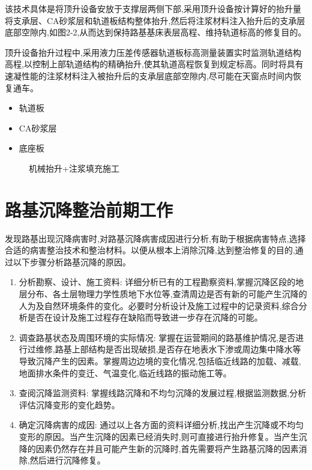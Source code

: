 \documentclass[a4paper,12pt]{ctexrep}
\begin{document}
该技术具体是将顶升设备安放于支撑层两侧下部,采用顶升设备按计算好的抬升量将支承层、CA砂浆层和轨道板结构整体抬升,然后将注浆材料注入抬升后的支承层底部空隙内,如图2-2,从而达到保持路基基床表层高程、维持轨道标高的修复目的。

顶升设备抬升过程中,采用液力压差传感器轨道板标高测量装置实时监测轨道结构高程,以控制上部轨道结构的精确抬升,使其轨道高程恢复到规定标高。同时将具有速凝性能的注浆材料注入被抬升后的支承层底部空隙内,尽可能在天窗点时间内恢复通车。

\begin{itemize}
    \item 轨道板
    \item CA砂浆层
    \item 底座板
\end{itemize}

\begin{figure}[htbp]
    \centering
    \caption{机械抬升+注浆填充施工}
    \label{fig:2-2}
\end{figure}

\section{路基沉降整治前期工作}

发现路基出现沉降病害时,对路基沉降病害成因进行分析,有助于根据病害特点,选择合适的病害整治技术和整治材料。以便从根本上消除沉降,达到整治修复的目的,通过以下步骤分析路基沉降的原因。

\begin{enumerate}
    \item 分析勘察、设计、施工资料: 详细分析已有的工程勘察资料,掌握沉降区段的地层分布、各土层物理力学性质地下水位等,查清周边是否有新的可能产生沉降的人为及自然环境条件的变化。必要时分析设计及施工过程中的记录资料,综合分析是否在设计及施工过程存在缺陷而导致进一步存在沉降的可能。
    \item 调查路基状态及周围环境的实际情况: 掌握在运营期间的路基维护情况,是否进行过维修,路基上部结构是否出现破损,是否存在地表水下渗或周边集中降水等导致沉降产生的因素。掌握周边边境的变化情况,包括临近线路的加载、减载,地面排水条件的变迁、气温变化,临近线路的振动施工等。
    \item 查阅沉降监测资料: 掌握线路沉降和不均匀沉降的发展过程,根据监测数据,分析评估沉降变形的变化趋势。
    \item 确定沉降病害的成因: 通过以上各方面的资料详细分析,找出产生沉降或不均匀变形的原因。当产生沉降的因素已经消失时,则可直接进行抬升修复。当产生沉降的因素仍然存在并且可能产生新的沉降时,首先需要将产生路基沉降的因素消除,然后进行沉降修复。
\end{enumerate}
\end{document}
